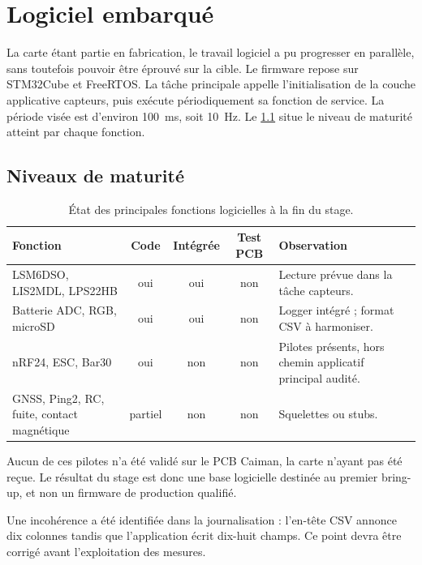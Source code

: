 \chapter{Logiciel embarqué}
\label{chap:software}

La carte étant partie en fabrication, le travail logiciel a pu progresser en parallèle, sans toutefois pouvoir être éprouvé sur la cible. Le firmware repose sur STM32Cube et FreeRTOS. La tâche principale appelle l'initialisation de la couche applicative capteurs, puis exécute périodiquement sa fonction de service. La période visée est d'environ \SI{100}{\milli\second}, soit \SI{10}{\hertz}. Le \cref{tab:drivers} situe le niveau de maturité atteint par chaque fonction.

\section{Niveaux de maturité}

\begin{table}[H]
  \centering
  \caption{État des principales fonctions logicielles à la fin du stage.}
  \label{tab:drivers}
  \begin{tabularx}{\textwidth}{@{}>{\raggedright\arraybackslash}p{} c c c >{\raggedright\arraybackslash}X@{}}
    \toprule
    \textbf{Fonction} & \textbf{Code} & \textbf{Intégrée} & \textbf{Test PCB} & \textbf{Observation} \\
    \midrule
    LSM6DSO, LIS2MDL, LPS22HB & oui & oui & non & Lecture prévue dans la tâche capteurs. \\
    Batterie ADC, RGB, microSD & oui & oui & non & Logger intégré ; format CSV à harmoniser. \\
    nRF24, ESC, Bar30 & oui & non & non & Pilotes présents, hors chemin applicatif principal audité. \\
    GNSS, Ping2, RC, fuite, contact magnétique & partiel & non & non & Squelettes ou stubs. \\
    \bottomrule
  \end{tabularx}
\end{table}

Aucun de ces pilotes n'a été validé sur le PCB Caiman, la carte n'ayant pas été reçue. Le résultat du stage est donc une base logicielle destinée au premier bring-up, et non un firmware de production qualifié.

Une incohérence a été identifiée dans la journalisation : l'en-tête CSV annonce dix colonnes tandis que l'application écrit dix-huit champs. Ce point devra être corrigé avant l'exploitation des mesures.

